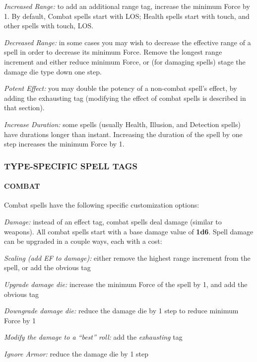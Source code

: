 \documentclass[oneside,10pt]{article}
\begin{document}
\begin{multicols}{2}
\begin{dent}
\textit{Increased Range:} to add an additional range tag, increase
the minimum Force by 1. By default, Combat spells start with
LOS; Health spells start
with touch, and other spells with touch, LOS.

\textit{Decreased Range:} in some cases you may wish to decrease
the effective range of a spell in order to decrease its minimum Force. Remove the longest range increment and either reduce minimum Force, or (for damaging spells) stage
the damage die type down one step.

\textit{Potent Effect:} you may double the potency of a non-combat spell’s effect, by adding the exhausting tag (modifying
the effect of combat spells is described in that section).

\textit{Increase Duration:} some spells (usually Health, Illusion,
and Detection spells) have durations longer than instant.
Increasing the duration of the spell by one step increases the minimum Force by 1.
\end{dent}

\subsubsection{TYPE-SPECIFIC SPELL TAGS}

\paragraph{COMBAT}

Combat spells have the following specific customization options:
\begin{dent}

\textit{Damage:} instead of an effect tag, combat spells deal damage (similar to weapons). All combat spells start with a
base damage value of \textbf{1d6}. Spell damage can be upgraded
in a couple ways, each with a cost:

\textit{Scaling (add EF to damage):} either remove the highest range increment
from the spell, or add the obvious tag

\textit{Upgrade damage die:} increase the minimum Force
of the spell by 1, and add the obvious tag

\textit{Downgrade damage die:} reduce the damage die by 1 step to reduce minimum Force by 1 

\textit{Modify the damage to a ``best'' roll:} add the \textit{exhausting} tag

\textit{Ignore Armor:} reduce the damage die by 1 step


\end{dent}
\end{multicols}
\end{document}
